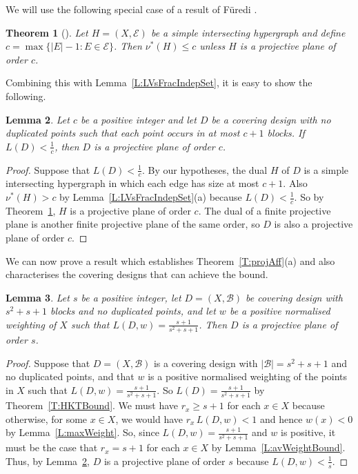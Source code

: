 \documentclass[11pt]{article}
\newtheorem{Theorem}{Theorem}[section]
\newtheorem{Lemma}[Theorem]{Lemma}
\theoremstyle{definition}
\renewcommand{\leq}{\leqslant}
\renewcommand{\geq}{\geqslant}
\newcommand{\B}{{\ensuremath{\mathcal{B}}}}
\newcommand{\E}{\mathcal{E}}
\begin{document}
We will use the following special case of a result of F{\"u}redi \cite[Corollary~1]{Fur}.

\begin{Theorem}[{\cite[Corollary~1]{Fur}}]\label{T:Furedi}
Let $H=(X,\E)$ be a simple intersecting hypergraph and define $c=\max\{|E|-1:E \in \E\}$. Then $\nu^*(H) \leq c$ unless $H$ is a projective plane of order $c$.
\end{Theorem}

Combining this with Lemma~\ref{L:LVsFracIndepSet}, it is easy to show the following.

\begin{Lemma}\label{L:FurediConsequence}
Let $c$ be a positive integer and let $D$ be a covering design with no duplicated points such that each point occurs in at most $c+1$ blocks. If $L(D) < \frac{1}{c}$, then $D$ is a projective plane of order $c$.
\end{Lemma}

\begin{proof}
Suppose that $L(D) < \frac{1}{c}$. By our hypotheses, the dual $H$ of $D$ is a simple intersecting hypergraph in which each edge has size at most $c+1$. Also $\nu^*(H)>c$ by Lemma~\ref{L:LVsFracIndepSet}(a) because $L(D) < \frac{1}{c}$. So by Theorem~\ref{T:Furedi}, $H$ is a projective plane of order $c$. The dual of a finite projective plane is another finite projective plane of the same order, so $D$ is also a projective plane of order $c$.
\end{proof}

We can now prove a result which establishes Theorem~\ref{T:projAff}(a) and also characterises the covering designs that can achieve the bound.

\begin{Lemma}\label{L:projPlanesEtc} Let $s$ be a positive integer, let $D=(X,\B)$ be covering design with $s^2+s+1$ blocks and no duplicated points, and let $w$ be a positive normalised weighting of $X$ such that $L(D,w)=\frac{s+1}{s^2+s+1}$. Then $D$ is a projective plane of order $s$.
\end{Lemma}

\begin{proof}
Suppose that $D=(X,\B)$ is a covering design with $|\B|=s^2+s+1$ and no duplicated points, and that $w$ is a positive normalised weighting of the points in $X$ such that $L(D,w)=\frac{s+1}{s^2+s+1}$. So $L(D)=\frac{s+1}{s^2+s+1}$ by Theorem~\ref{T:HKTBound}. We must have $r_x \geq s+1$ for each $x \in X$ because otherwise, for some $x \in X$, we would have $r_x\, L(D,w) < 1$ and hence $w(x) < 0$  by Lemma~\ref{L:maxWeight}. So, since $L(D,w)=\frac{s+1}{s^2+s+1}$ and $w$ is positive, it must be the case that $r_x = s+1$ for each $x \in X$ by Lemma~\ref{L:avWeightBound}. Thus, by Lemma~\ref{L:FurediConsequence}, $D$ is a projective plane of order $s$ because $L(D,w)<\frac{1}{s}$.
\end{proof}
\end{document}
